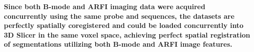 \textbf{Since both B-mode and ARFI imaging data were acquired concurrently using the same probe and sequences, the datasets are perfectly spatially coregistered and could be loaded concurrently into 3D Slicer in the same voxel space, achieving perfect spatial registration of segmentations utilizing both B-mode and ARFI image features.}
